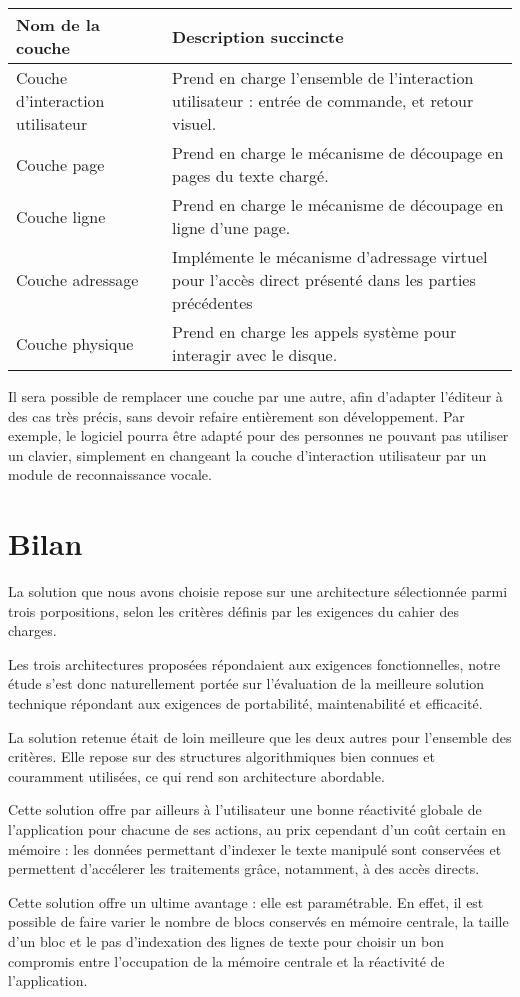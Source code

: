 \begin{center}
    \begin{tabular}{l|p{7cm}}
	Nom de la couche & Description succincte \\
	\hline \hline
	Couche d'interaction utilisateur & Prend en charge l'ensemble de
	l'interaction utilisateur : entrée de commande, et retour visuel.\\
	\hline
	Couche page & Prend en charge le mécanisme de découpage en pages du
	texte chargé.\\
	\hline
	Couche ligne & Prend en charge le mécanisme de découpage en ligne d'une
	page.\\
	\hline
	Couche adressage & Implémente le mécanisme d'adressage virtuel pour
	l'accès direct présenté dans les parties précédentes\\
	\hline
	Couche physique & Prend en charge les appels système pour interagir
	avec le disque.\\
	\hline
    \end{tabular}
\end{center}

Il sera possible de remplacer une couche par une autre, afin d'adapter
l'éditeur à des cas très précis, sans devoir refaire entièrement son
développement. Par exemple, le logiciel pourra être adapté pour des personnes
ne pouvant pas utiliser un clavier, simplement en changeant la couche
d'interaction utilisateur par un module de reconnaissance vocale.


\section{Bilan}
La solution que nous avons choisie repose sur une architecture sélectionnée
parmi trois porpositions, selon les critères définis par les exigences du
cahier des charges.

Les trois architectures proposées répondaient aux exigences fonctionnelles, notre
étude s'est donc naturellement portée sur l'évaluation de la meilleure solution
technique répondant aux exigences de portabilité, maintenabilité et efficacité.

La solution retenue était de loin meilleure que les deux autres pour l'ensemble
des critères. Elle repose sur des structures algorithmiques bien connues et
couramment utilisées, ce qui rend son architecture abordable.

Cette solution offre par ailleurs à l'utilisateur une bonne réactivité globale
de l'application pour chacune de ses actions, au prix cependant d'un coût certain
en mémoire : les données permettant d'indexer le texte manipulé sont conservées
et permettent d'accélerer les traitements grâce, notamment, à des accès
directs.

Cette solution offre un ultime avantage : elle est paramétrable. En effet, il est
possible de faire varier le nombre de blocs conservés en mémoire centrale, la
taille d'un bloc et le pas d'indexation des lignes de texte pour choisir un bon
compromis entre l'occupation de la mémoire centrale et la réactivité de
l'application.
